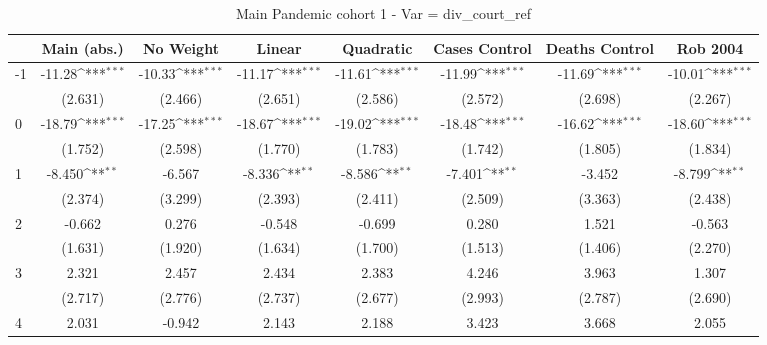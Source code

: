 \documentclass{article}
\begin{document}
{
\def\sym#1{\ifmmode^{#1}\else\(^{#1}\)\fi}
\begin{longtable}{l*{7}{c}}
\caption{Main Pandemic cohort 1 - Var = div\_court\_ref}\\
\hline\hline\endfirsthead\hline\endhead\hline\endfoot\endlastfoot
                &\multicolumn{1}{c}{Main (abs.)}&\multicolumn{1}{c}{No Weight}&\multicolumn{1}{c}{Linear}&\multicolumn{1}{c}{Quadratic}&\multicolumn{1}{c}{Cases Control}&\multicolumn{1}{c}{Deaths Control}&\multicolumn{1}{c}{Rob 2004}\\
\hline
-1              &   -11.28\sym{***}&   -10.33\sym{***}&   -11.17\sym{***}&   -11.61\sym{***}&   -11.99\sym{***}&   -11.69\sym{***}&   -10.01\sym{***}\\
                &  (2.631)         &  (2.466)         &  (2.651)         &  (2.586)         &  (2.572)         &  (2.698)         &  (2.267)         \\
0               &   -18.79\sym{***}&   -17.25\sym{***}&   -18.67\sym{***}&   -19.02\sym{***}&   -18.48\sym{***}&   -16.62\sym{***}&   -18.60\sym{***}\\
                &  (1.752)         &  (2.598)         &  (1.770)         &  (1.783)         &  (1.742)         &  (1.805)         &  (1.834)         \\
1               &   -8.450\sym{**} &   -6.567         &   -8.336\sym{**} &   -8.586\sym{**} &   -7.401\sym{**} &   -3.452         &   -8.799\sym{**} \\
                &  (2.374)         &  (3.299)         &  (2.393)         &  (2.411)         &  (2.509)         &  (3.363)         &  (2.438)         \\
2               &   -0.662         &    0.276         &   -0.548         &   -0.699         &    0.280         &    1.521         &   -0.563         \\
                &  (1.631)         &  (1.920)         &  (1.634)         &  (1.700)         &  (1.513)         &  (1.406)         &  (2.270)         \\
3               &    2.321         &    2.457         &    2.434         &    2.383         &    4.246         &    3.963         &    1.307         \\
                &  (2.717)         &  (2.776)         &  (2.737)         &  (2.677)         &  (2.993)         &  (2.787)         &  (2.690)         \\
4               &    2.031         &   -0.942         &    2.143         &    2.188         &    3.423         &    3.668         &    2.055         \\

\end{longtable}}
\end{document}
